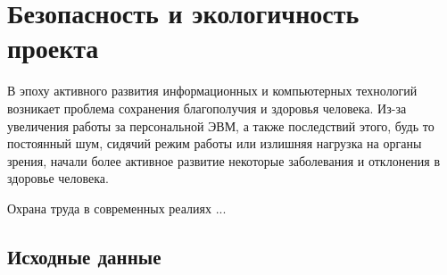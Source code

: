 \section{Безопасность и экологичность проекта}

В эпоху активного развития информационных и компьютерных технологий возникает проблема сохранения благополучия и здоровья человека.
Из-за увеличения работы за персональной ЭВМ, а также последствий этого, будь то постоянный шум, сидячий режим работы или излишняя нагрузка на органы зрения, начали более активное развитие некоторые заболевания и отклонения в здоровье человека.

Охрана труда в современных реалиях ...

\subsection{Исходные данные}

